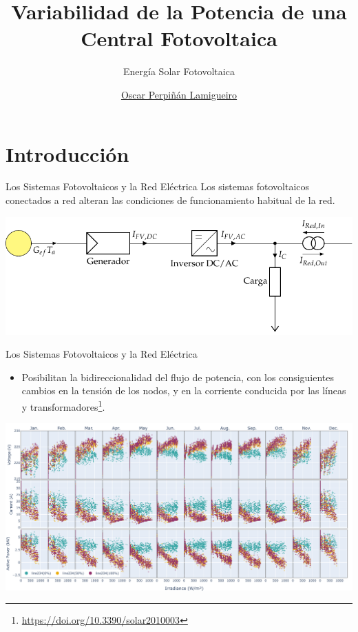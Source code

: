 \documentclass[aspectratio=169, usenames,svgnames,dvipsnames]{beamer}
\author{\href{https://oscarperpinan.github.io}{Oscar Perpiñán Lamigueiro}}
\date{}
\title{Variabilidad de la Potencia de una Central Fotovoltaica}
\subtitle{Energía Solar Fotovoltaica}
\institute[UPM]{Universidad Politécnica de Madrid}
\begin{document}
\maketitle

\section{Introducción}
\label{sec:org3076100}

\begin{frame}[label={sec:org43aa085}]{Los Sistemas Fotovoltaicos y la Red Eléctrica}
Los sistemas fotovoltaicos conectados a red alteran las condiciones de
funcionamiento habitual de la red.

\begin{center}
\includegraphics[width=\textwidth]{../figs/SFCR_bidireccional.pdf}
\end{center}
\end{frame}

\begin{frame}[label={sec:org37b3a5e}]{Los Sistemas Fotovoltaicos y la Red Eléctrica}
\begin{itemize}
\item Posibilitan la bidireccionalidad del flujo de potencia, con los
consiguientes cambios en la tensión de los nodos, y en la corriente
conducida por las líneas y transformadores\footnote{\url{https://doi.org/10.3390/solar2010003}}.
\end{itemize}

\begin{center}
\includegraphics[height=0.65\textheight]{../figs/S_VIP_Irr_line234.pdf}
\end{center}
\end{frame}
\end{document}
